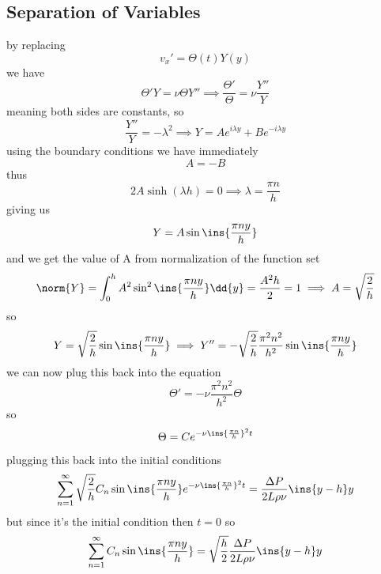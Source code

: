 \subsection{Separation of Variables}
by replacing 
\begin{equation}
	v_x' = \Theta(t)Y(y)
\end{equation}
we have 
\begin{equation}
	\Theta' Y=\nu\Theta Y'' \implies \frac{\Theta'}{\Theta} = \nu\frac{Y''}{Y}
\end{equation}
meaning both sides are constants, so 
\begin{equation}
	\frac{Y''}{Y}=-\lambda^2 \implies Y = Ae^{i\lambda y}+Be^{-i\lambda y}
\end{equation}
using the boundary conditions we have immediately
\begin{equation}
	A=-B 
\end{equation}
thus 
\begin{equation}
	2A\sinh(\lambda h)=0 \implies \lambda = \frac{\pi n}{h}
\end{equation}
giving us 
\begin{equation}
	Y = A\sin\ins{\frac{\pi n y}{h}}
\end{equation}
and we get the value of A from normalization of the function set 
\begin{equation}
	\norm{Y} = \int_{0}^{h}A^2\sin^2\ins{\frac{\pi n y}{h}}\dd{y} = \frac{A^2h}{2} =1\implies A = \sqrt{\frac{2}{h}}
\end{equation}
so 
\begin{equation}
	Y = \sqrt{\frac{2}{h}}\sin\ins{\frac{\pi n y}{h}} \implies Y''=-\sqrt{\frac{2}{h}}\frac{\pi^2 n^2}{h^2}\sin\ins{\frac{\pi n y}{h}}
\end{equation}
we can now plug this back into the equation
\begin{equation}
	\Theta' = -\nu\frac{\pi^2 n^2}{h^2}\Theta
\end{equation}
so
\begin{equation}
\Theta = Ce^{-\nu\ins{\frac{\pi n}{h}}^2 t}
\end{equation}
plugging this back into the initial conditions
\begin{equation}
	\sum_{n=1}^{\infty}\sqrt{\frac{2}{h}}C_n \sin\ins{\frac{\pi n y}{h}}e^{-\nu\ins{\frac{\pi n}{h}}^2 t} = \frac{\Delta P}{2L\rho\nu}\ins{y-h}y
\end{equation}
but since it's the initial condition then \(t=0\) so
\begin{equation}
	\sum_{n=1}^{\infty}C_n \sin\ins{\frac{\pi n y}{h}} = \sqrt{\frac{h}{2}}\frac{\Delta P}{2L\rho\nu}\ins{y-h}y
\end{equation}
